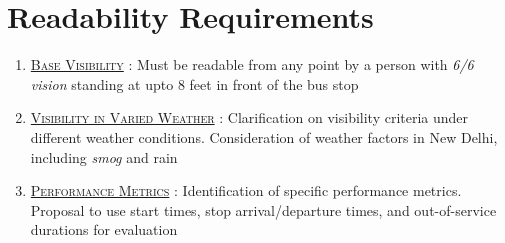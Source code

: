 \section{Readability Requirements}

\begin{enumerate}
    \item {}\underline{\textsc{Base Visibility}} : Must be readable from any point by a person with \textit{\gls{6/6 vision}} standing at upto 8 feet in front of the bus stop

    \item \underline{\textsc{Visibility in Varied Weather}} : Clarification on visibility criteria under different weather conditions. Consideration of weather factors in New Delhi, including \textit{\gls{smog}} and rain

    \item \underline{\textsc{Performance Metrics}} : Identification of specific performance metrics. Proposal to use start times, stop arrival/departure times, and out-of-service durations for evaluation

\end{enumerate}